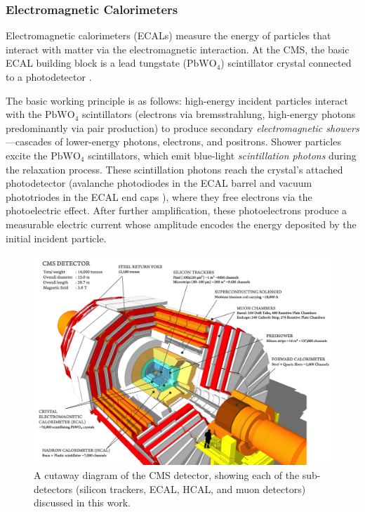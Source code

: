 \documentclass[11pt, a4paper]{article}
\newcommand{\chem}[1]{\ensuremath{\mathrm{#1}}}  %
\begin{document}
\subsubsection{Electromagnetic Calorimeters}
Electromagnetic calorimeters (ECALs) measure the energy of particles that interact with matter via the electromagnetic interaction. At the CMS, the basic ECAL building block is a lead tungstate (\chem{PbWO_4}) scintillator crystal connected to a photodetector \cite{ecal-tdr}.

The basic working principle is as follows: high-energy incident particles interact with the \chem{PbWO_4} scintillators (electrons via bremsstrahlung, high-energy photons predominantly via pair production) to produce secondary \textit{electromagnetic showers}---cascades of lower-energy photons, electrons, and positrons. Shower particles excite the \chem{PbWO_4} scintillators, which emit blue-light \textit{scintillation photons} during the relaxation process. These scintillation photons reach the crystal's attached photodetector (avalanche photodiodes in the ECAL barrel and vacuum phototriodes in the ECAL end caps \cite{ecal-tdr}), where they free electrons via the photoelectric effect. After further amplification, these photoelectrons produce a measurable electric current whose amplitude encodes the energy deposited by the initial incident particle.

\begin{figure}[htb!]
    \centering
    \includegraphics[width=0.9\linewidth]{raster/png/cms.png}
    \caption{A cutaway diagram of the CMS detector, showing each of the sub-detectors (silicon trackers, ECAL, HCAL, and muon detectors) discussed in this work. \cite{image-cms}}
    \label{fig:cms}
\end{figure}
\end{document}
